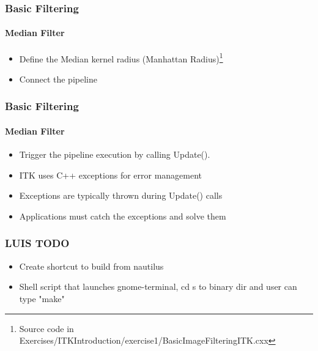 {
\begin{frame}[fragile]
\frametitle{Basic Filtering}
\framesubtitle{Median Filter}
\begin{itemize}
\item Define the Median kernel radius (Manhattan Radius)\footnote{Source code in Exercises/ITKIntroduction/exercise1/BasicImageFilteringITK.cxx}
\end{itemize}
\begin{center}
\end{center}
\pause
\begin{itemize}
\item Connect the pipeline
\end{itemize}
\begin{center}
\end{center}
\end{frame}
}

{
\begin{frame}[fragile]
\frametitle{Basic Filtering}
\framesubtitle{Median Filter}
\begin{itemize}
\item Trigger the pipeline execution by calling Update().
\end{itemize}
\begin{center}
\end{center}
\pause
\begin{itemize}
\item ITK uses C++ exceptions for error management
\item Exceptions are typically thrown during Update() calls
\item Applications must catch the exceptions and solve them
\end{itemize}
\end{frame}
}


\begin{frame}
\frametitle{LUIS TODO}
\begin{itemize}
\item Create shortcut to build from nautilus
\item Shell script that launches gnome-terminal, cd s to binary dir and user can type "make"
\end{itemize}
\end{frame}


